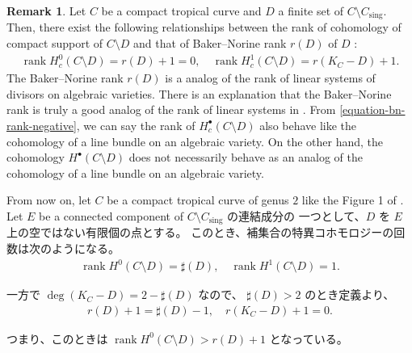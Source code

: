 \documentclass[a4paper,dvipdfmx,reqno,12pt]{amsart}
\theoremstyle{definition}
\newtheorem{remark}[theorem]{Remark}
\newcommand{\opn}[1]{\operatorname{#1}}
\numberwithin{equation}{section}
\begin{document}
\begin{remark}
\label{remark-complement-cohomology}
Let $C$ be a compact tropical curve and $D$
a finite set of $C\setminus C_{\mathrm{sing}}$.
Then, there exist the following relationships
between the rank of cohomology of compact support
of $C\setminus D$ and that of Baker--Norine rank
$r(D)$ of $D$ \cite[Definition 1.12]{MR2377750}: 
\begin{align}
\label{equation-bn-rank-negative}
\opn{rank} H_c^{0}(C\setminus D)=r(D)+1=0, \quad
\opn{rank} H_c^{1}(C\setminus D)=r(K_C-D)+1.
\end{align}
The Baker--Norine rank $r(D)$ is a analog of 
the rank of linear systems of divisors on
algebraic varieties.
There is an explanation that the Baker--Norine
rank is truly a good analog of the rank of linear systems
in \cite{MR2448666}.
From \eqref{equation-bn-rank-negative},
we can say the rank of $H_c^{\bullet}(C\setminus D)$
also behave like the cohomology of a line bundle on
an algebraic variety.
On the other hand, the cohomology
$H^{\bullet}(C\setminus D)$ does not necessarily behave
as an analog of the cohomology of a line bundle on
an algebraic variety.

From now on, let $C$ be a compact tropical curve
of genus $2$ like the Figure 1 of
\cite{MR2457739}.
Let $E$ be a connected component of  
 $C\setminus C_{\mathrm{sing}}$ の連結成分の
一つとして、$D$ を $E$ 上の空ではない有限個の点とする。
このとき、補集合の特異コホモロジーの回数は次のようになる。
\begin{align}
\label{equation-cohomology-behaviour}
\opn{rank} H^{0}(C\setminus D)=\sharp(D), \quad
\opn{rank} H^{1}(C\setminus D)=1.
\end{align}

一方で $\opn{deg}(K_C-D)=2-\sharp (D)$ なので、
$\sharp (D)>2$ のとき定義より、
\begin{align}
\label{equation-rank-behaviour}
r(D)+1=\sharp(D)-1,\quad r(K_C-D)+1=0.
\end{align}

つまり、このときは 
$\opn{rank} H^{0}(C\setminus D)>r(D)+1$ となっている。


\end{remark}
\end{document}
